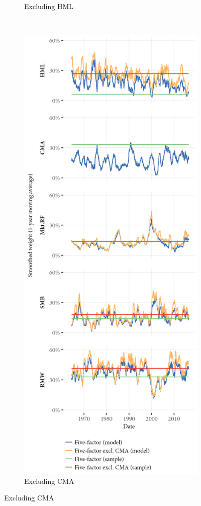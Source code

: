 \begin{figure}[htbp]
\begin{subfigure}{0.45\textwidth}
    \caption{Excluding HML}
  \end{subfigure}
  ~
  \begin{subfigure}{0.45\textwidth}
    \includegraphics[width=\textwidth]{graphics/weights/main_Weights_MV_5F_EXCL_CMA_5F.png}
    \caption{Excluding CMA}
  \end{subfigure}  
\end{figure}

